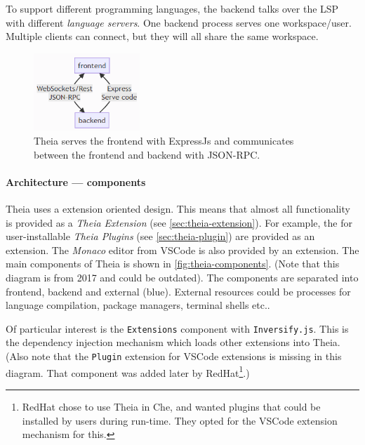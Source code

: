To support different programming languages, the backend talks over the \acrfull{LSP} with different \emph{language servers}.
One backend process serves one workspace/user.
Multiple clients can connect, but they will all share the same workspace.~\cite{MultiLanguageIDEImplemented2017}

\begin{figure}[htbp]
  \centering
  \includegraphics[width=4cm]{figures/theia-api.png}
  \caption[Theia frontend and backend communication]{Theia serves the frontend with ExpressJs and communicates between the frontend and backend with JSON-RPC.}\label{fig:theia-communication}
\end{figure}

\paragraph*{Architecture --- components}
\Gls{Theia} uses a extension oriented design.
This means that almost all functionality is provided as a \emph{Theia Extension} (see \cref{sec:theia-extension}).
For example, the  for user-installable \emph{Theia Plugins} (see \cref{sec:theia-plugin}) are provided as an extension.
The \emph{Monaco} editor from \gls{VSCode} is also provided by an extension.
The main components of Theia is shown in \cref{fig:theia-components}.
(Note that this diagram is from 2017 and could be outdated).
The components are separated into frontend, backend and external (blue).
External resources could be processes for language compilation, package managers, terminal shells etc..

Of particular interest is the \texttt{Extensions} component with \texttt{Inversify.js}. This is the dependency injection mechanism which loads other extensions into Theia. (Also note that the \texttt{Plugin} extension for \gls{VSCode} extensions is missing in this diagram. That component was added later by RedHat\footnote{RedHat chose to use Theia in \gls{Che}, and wanted plugins that could be installed by users during run-time. They opted for the \gls{VSCode} extension mechanism for this.}.)

